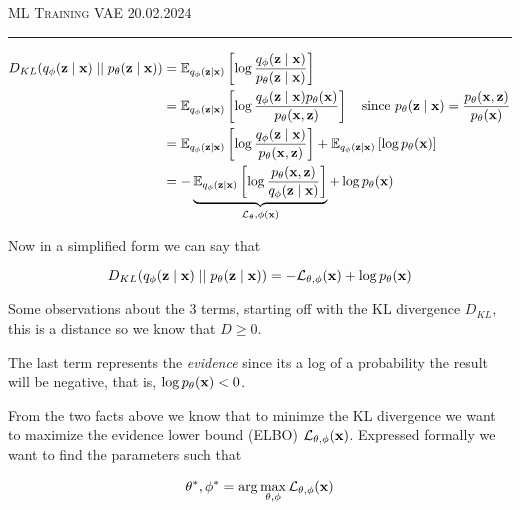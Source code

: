 \documentclass[12pt]{article}
\begin{document}
\thispagestyle{empty}

{\scshape ML } \hfill {\scshape \large Training VAE} \hfill {\scshape 20.02.2024}
 
\smallskip
\hrule
\bigskip

\begin{align*}
    D_{KL}(q_\phi(\mathbf{z} \mid \mathbf{x}) \mid\mid p_\theta(\mathbf{z}\mid \mathbf{x})) &= \operatorname{\mathbb{E}}_{q_\phi(\mathbf{z} \mid \mathbf{x})}\left[\log\frac{q_\phi(\mathbf{z} \mid \mathbf{x})}{p_\theta(\mathbf{z} \mid \mathbf{x})}\right] 
    \\
    &= \operatorname{\mathbb{E}}_{q_\phi(\mathbf{z}\mid \mathbf{x})}\left[ \log\frac{q_\phi(\mathbf{z}\mid \mathbf{x})p_\theta(\mathbf{x})}{p_\theta(\mathbf{x}, \mathbf{z})} \right] \quad \text{since } p_\theta(\mathbf{z}\mid \mathbf{x}) = \frac{p_\theta(\mathbf{x}, \mathbf{z})}{p_\theta(\mathbf{x})} 
    \\
    &= \operatorname{\mathbb{E}}_{q_\phi(\mathbf{z}\mid \mathbf{x})}\left[ \log\frac{q_\phi(\mathbf{z}\mid \mathbf{x})}{p_\theta(\mathbf{x}, \mathbf{z})} \right] + \operatorname{\mathbb{E}}_{q_\phi(\mathbf{z}\mid \mathbf{x})}\left[\log p_\theta(\mathbf{x})\right] 
    \\
    &= -\underbrace{
        \operatorname{\mathbb{E}}_{q_\phi(\mathbf{z}\mid \mathbf{x})}
        \left[
            \log\frac{p_\theta(\mathbf{x}, \mathbf{z})}{q_\phi(\mathbf{z} \mid \mathbf{x})} 
        \right]
        }_{
            \mathcal L_\theta, \phi(\mathbf x)
        } + \log p_\theta(\mathbf{x}) \\
\end{align*}

Now in a simplified form we can say that

\begin{equation}
    D_{KL}(q_\phi(\mathbf{z} \mid \mathbf{x}) \mid\mid p_\theta(\mathbf{z}\mid \mathbf{x})) = -\mathcal L_{\theta, \phi}(\mathbf x) + \log p_\theta(\mathbf{x})
\end{equation}

Some observations about the 3 terms, starting off with the KL divergence $D_{KL}$, this is a distance so we know that $D\geq 0$. 
\smallskip 

The last term represents the \textit{evidence} since its a log of a probability the result will be negative, that is, $\log p_\theta(\mathbf{x}) < 0$. 
\smallskip

From the two facts above we know that to minimze the KL divergence we want to maximize the evidence lower bound (ELBO) $\mathcal L_{\theta,\phi}(\mathbf{x})$. Expressed formally we want to find the parameters such that 

\begin{align*}
    \theta^*, \phi^*=\arg\max_{\theta,\phi}\mathcal L _{\theta, \phi}(\mathbf{x})    
\end{align*}
\end{document}
